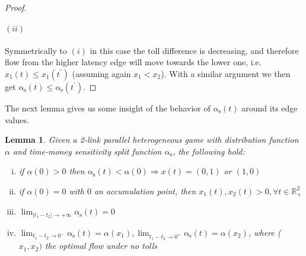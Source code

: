 \documentclass[a4paper,11pt]{article}
\newcommand{\as}{\mathrm{\alpha_s}}
\newcommand{\R}{\mathbb{R}}
\newtheorem{lemma}{Lemma}[section]
\begin{document}
\begin{proof}
	\paragraph{$(ii)$}
	Symmetrically to $(i)$ in this case the toll difference is decreasing, and therefore flow from the higher latency edge will move towards the lower one, i.e. $x_1(t) \le x_1(t^\prime)$ (assuming again $x_1 < x_2$).
	With a similar argument we then get $\as(t) \le \as(t^\prime)$.
\end{proof}

The next lemma gives us some insight of the behavior of $\as(t)$ around its edge values.
\begin{lemma}
	\label{lemma:split_bounds}
	Given a 2-link parallel heterogeneous game with distribution function $\alpha$ and time-money sensitivity split function $\as$, the following hold:
	\begin{enumerate}[(i)]
		\item if $\alpha(0) > 0$ then $\as(t) < \alpha(0) \Rightarrow x(t) = (0, 1)$ or $(1, 0)$
		\item if $\alpha(0) = 0$ with $0$ an accumulation point, then $x_1(t), x_2(t) > 0, \forall t \in \R_+^2$
		\item $\lim_{|t_1 - t_2| \rightarrow +\infty}\as(t) = 0$
		\item $\lim_{t_1 - t_2 \rightarrow 0^-} \as(t) = \alpha(x_1), \lim_{t_1 - t_2 \rightarrow 0^+} \as(t) = \alpha(x_2)$, where ($x_1, x_2)$ the optimal flow under no tolls
	\end{enumerate}
\end{lemma}
\end{document}
